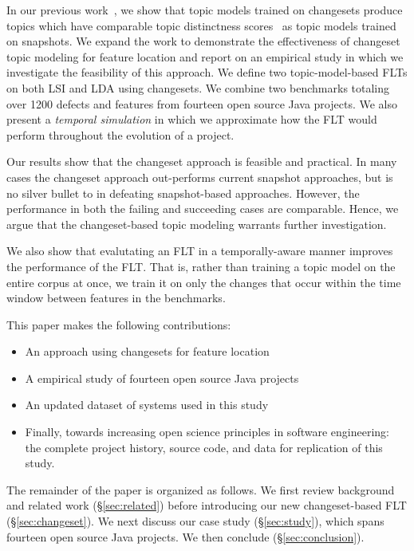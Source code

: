 In our previous work~\cite{Corley-etal:2014}, we show that topic models trained on changesets produce topics which have comparable
topic distinctness scores~\cite{Thomas-etal:2011} as topic models trained on snapshots.
We expand the work to demonstrate the effectiveness of changeset topic modeling for feature location and report on an empirical study in which we investigate the feasibility of this approach.
We define two topic-model-based FLTs on both LSI and LDA using changesets.
We combine two benchmarks totaling over 1200 defects and features from fourteen open source Java projects.
We also present a \emph{temporal simulation} in which we approximate how the FLT would perform throughout the evolution of a project.

Our results show that the changeset approach is feasible and practical.
In many cases the changeset approach out-performs current snapshot approaches, but is no silver bullet to in defeating snapshot-based approaches.
However, the performance in both the failing and succeeding cases are comparable.
Hence, we argue that the changeset-based topic modeling warrants further investigation.

We also show that evalutating an FLT in a temporally-aware manner improves the performance of the FLT.
That is, rather than training a topic model on the entire corpus at once,
we train it on only the changes that occur within the time window between features in the benchmarks.

This paper makes the following contributions:

\begin{itemize}
    \item An approach using changesets for feature location
    \item A empirical study of fourteen open source Java projects
    \item An updated dataset of systems used in this study
    \item Finally, towards increasing open science principles in software engineering:
        the complete project history, source code, and data for replication of this study.
\end{itemize}

The remainder of the paper is organized as follows.
We first review background and related work (\S\ref{sec:related})
before introducing our new changeset-based FLT (\S\ref{sec:changeset}).
We next discuss our case study (\S\ref{sec:study}), which spans fourteen open source Java projects.
We then conclude (\S\ref{sec:conclusion}).

